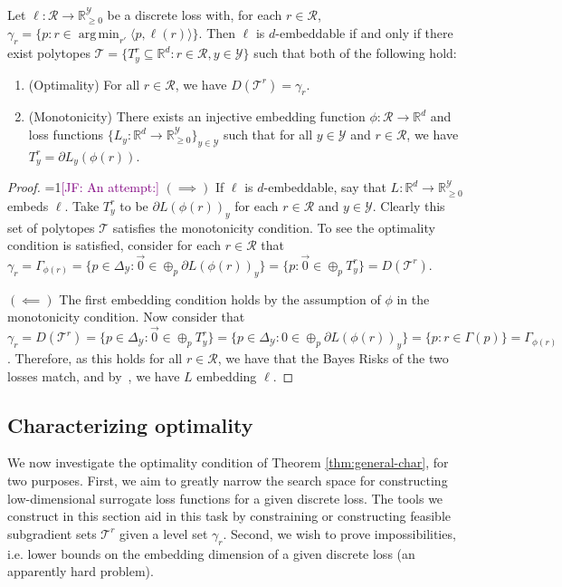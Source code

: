 \documentclass[anon]{colt2020} %
\newcommand{\Comments}{1}
\newcommand{\mynote}[2]{\ifnum\Comments=1\textcolor{#1}{#2}\fi}
\newcommand{\jessie}[1]{\mynote{purple}{[JF: #1]}}
\newcommand{\reals}{\mathbb{R}}
\newcommand{\simplex}{\Delta_\Y}
\newcommand{\R}{\mathcal{R}}
\newcommand{\T}{\mathcal{T}}
\newcommand{\Y}{\mathcal{Y}}
\newcommand{\inprod}[2]{\langle #1, #2 \rangle}%
\DeclareMathOperator*{\argmin}{arg\,min}
\begin{document}
\begin{theorem} \label{thm:general-char}
  Let $\ell: \R \to \reals_{\geq 0}^{\Y}$ be a discrete loss with, for each $r \in \R$, $\gamma_r = \{p : r \in \argmin_{r'} \inprod{p}{\ell(r)}\}$.
  Then $\ell$ is $d$-embeddable if and only if there exist polytopes $\T = \{T^r_y \subseteq \reals^d : r \in \R, y \in \Y\}$ such that both of the following hold:
  \begin{enumerate}
    \item (Optimality) For all $r \in \R$, we have $D(\T^r) = \gamma_r$.
    \item (Monotonicity) There exists an injective embedding function $\phi : \R \to \reals^d$ and loss functions $\{L_y : \reals^d \to \reals^\Y_{\geq 0}\}_{y \in \Y}$ such that for all $y \in \Y$ and $r \in \R$, we have $T^r_y = \partial L_y(\phi(r))$.
  \end{enumerate}
\end{theorem}
\begin{proof}
  \jessie{An attempt:}
  $(\implies)$ If $\ell$ is $d$-embeddable, say that $L:\reals^d \to \reals^\Y_{\geq 0}$ embeds $\ell$.
  Take $T^r_y$ to be $\partial L(\phi(r))_y$ for each $r \in \R$ and $y \in \Y$.
  Clearly this set of polytopes $\T$ satisfies the monotonicity condition.
  To see the optimality condition is satisfied, consider for each $r \in \R$ that $\gamma_r = \Gamma_{\phi(r)} = \{p \in \simplex : \vec 0 \in \oplus_p \partial L(\phi(r))_y \} = \{p : \vec 0 \in \oplus_p T^r_y \} = D(\T^r)$.
  
  \bigskip
  $(\impliedby)$ The first embedding condition holds by the assumption of $\phi$ in the monotonicity condition.
  Now consider that $\gamma_r = D(\T^r) = \{p \in \simplex : \vec 0 \in \oplus_p T^r_y \} = \{p \in \simplex : 0 \in \oplus_p \partial L(\phi(r))_y \} = \{p : r \in \Gamma(p) \} =  \Gamma_{\phi(r)}$.
  Therefore, as this holds for all $r \in \R$, we have that the Bayes Risks of the two losses match, and by~\cite[Proposition 1]{finocchiaro2019embedding}, we have $L$ embedding $\ell$. 
\end{proof}


\subsection{Characterizing optimality}\label{subsec:opt-conditions}

We now investigate the optimality condition of Theorem \ref{thm:general-char}, for two purposes.
First, we aim to greatly narrow the search space for constructing low-dimensional surrogate loss functions for a given discrete loss.
The tools we construct in this section aid in this task by constraining or constructing feasible subgradient sets $\T^r$ given a level set $\gamma_r$.
Second, we wish to prove impossibilities, i.e. lower bounds on the embedding dimension of a given discrete loss (an apparently hard problem).
\end{document}
